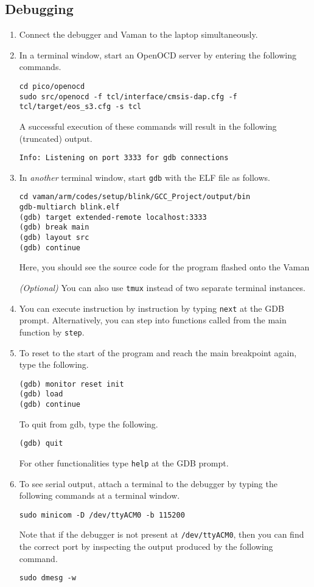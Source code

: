\subsection{Debugging}
\begin{enumerate}
    \item Connect the debugger and Vaman to the laptop simultaneously.
    \item In a terminal window, start an OpenOCD server by entering the
    following commands.
    \begin{lstlisting}
cd pico/openocd
sudo src/openocd -f tcl/interface/cmsis-dap.cfg -f tcl/target/eos_s3.cfg -s tcl
    \end{lstlisting}
    A successful execution of these commands will result in the following
    (truncated) output.
    \begin{lstlisting}
Info: Listening on port 3333 for gdb connections
    \end{lstlisting}
    \item In \emph{another} terminal window, start \texttt{gdb} with the ELF
    file as follows.
    \begin{lstlisting}
cd vaman/arm/codes/setup/blink/GCC_Project/output/bin
gdb-multiarch blink.elf
(gdb) target extended-remote localhost:3333
(gdb) break main
(gdb) layout src
(gdb) continue
    \end{lstlisting}
    Here, you should see the source code for the program flashed onto the Vaman

    \emph{(Optional)} You can also use \texttt{tmux} instead of two separate
    terminal instances.
    \item You can execute instruction by instruction by typing \texttt{next} at
    the GDB prompt. Alternatively, you can step into functions called from the
    main function by \texttt{step}. 
    \item To reset to the start of the program and reach the main breakpoint
    again, type the following.
    \begin{lstlisting}
(gdb) monitor reset init
(gdb) load
(gdb) continue
    \end{lstlisting}
    To quit from gdb, type the following.
    \begin{lstlisting}
(gdb) quit
    \end{lstlisting}
    For other functionalities type \texttt{help} at the GDB prompt.
    \item To see serial output, attach a terminal to the debugger by typing the
    following commands at a terminal window.
    \begin{lstlisting}
sudo minicom -D /dev/ttyACM0 -b 115200
    \end{lstlisting}
    Note that if the debugger is not present at \texttt{/dev/ttyACM0}, then you
    can find the correct port by inspecting the output produced by the
    following command.
    \begin{lstlisting}
sudo dmesg -w
    \end{lstlisting}
\end{enumerate}